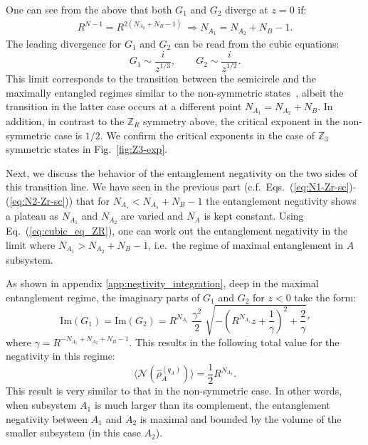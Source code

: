 \documentclass[aps,pra,reprint,superscriptaddress,twocolumn,notitlepage]{revtex4-1}
\newcommand{\Z}{\mathbb{Z}}
\numberwithin{equation}{section}
\begin{document}
One can see from the above that both $G_1$ and $G_2$ diverge at $z=0$ if:
\begin{equation}
\begin{aligned}
    R^{N-1} = R^{2 \left( N_{A_2} + N_B - 1 \right)} \ \Rightarrow N_{A_1} = N_{A_2} + N_B - 1.
\end{aligned}    
\end{equation}
The leading divergence for $G_1$ and $G_2$ can be read from the cubic equations:
\begin{equation}
    G_1 \sim \frac{i}{z^{1/3}}, \qquad G_2 \sim \frac{i}{z^{1/2}}.
\end{equation}
This limit corresponds to the transition between the semicircle and the maximally entangled regimes similar to the non-symmetric states~\cite{Shapourian2021}, albeit the transition in the latter case occurs at a different point $N_{A_1}=N_{A_2}+N_B$. In addition, in contrast to the $\Z_R$ symmetry above, the critical exponent in the non-symmetric case is $1/2$. We confirm the critical exponents in the case of $\Z_3$ symmetric states in Fig.~\ref{fig:Z3-exp}.

Next, we discuss the behavior of the entanglement negativity on the two sides of this transition line. We have seen in the previous part (c.f.~Eqs.~(\ref{eq:N1-Zr-sc})-(\ref{eq:N2-Zr-sc})) that for $N_{A_s} < N_{A_{\bar{s}}} + N_B - 1$ the entanglement negativity shows a plateau as $N_{A_1}$ and $N_{A_2}$ are varied and $N_A$ is kept constant.
Using Eq.~(\ref{eq:cubic_eq_ZR}), one can work out the entanglement negativity in the limit where $N_{A_1} > N_{A_2} + N_B - 1$, i.e.~the regime of maximal entanglement in $A$ subsystem.

As shown in appendix \ref{app:negtivity_integration}, deep in the maximal entanglement regime, the imaginary parts of $G_1$ and $G_2$ for $z<0$ take the form:
\begin{equation}
    \mathrm{Im}(G_1) = \mathrm{Im}(G_2) = R^{N_{A_1}} \; \frac{\gamma^2}{2} \; \sqrt{-\left( R^{N_{A_1} } z + \frac{1}{\gamma} \right)^2 + \frac2\gamma}'
\end{equation}
where $\gamma = R^{-N_{A_1}+N_{A_2}+N_B - 1}$. This results in the following total value for the negativity in this regime:
\begin{equation}
    \langle \mathcal{N}(\hat\rho_A^{(q_A)}) \rangle = \frac{1}{2} R^{N_{A_2}}.
\end{equation}
This result is very similar to that in the non-symmetric case. In other words, when subsystem $A_1$ is much larger than its complement, the entanglement negativity between $A_1$ and $A_2$ is maximal and bounded by the volume of the smaller subsystem (in this case $A_2$).
\end{document}
